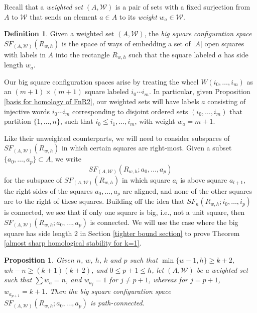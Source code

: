 \documentclass[pagebackref,colorlinks,citecolor=blue,linkcolor=blue,urlcolor=blue,filecolor=blue]{article}
\newtheorem{prop}[thm]{Proposition}
\theoremstyle{definition}\newtheorem{definition}[thm]{Definition}
\theoremstyle{definition}
\newtheorem{defn}[thm]{Definition}
\begin{document}
Recall that a \emph{weighted set} $(A, \mathcal{W})$ is a pair of sets with a fixed surjection from $A$ to $\mathcal{W}$ that sends an element $a\in A$ to its \emph{weight} $w_{a}\in \mathcal{W}$.

\begin{defn}
Given a weighted set $(A, \mathcal{W})$, the \emph{big square configuration space} $SF_{(A, \mathcal{W})}(R_{w,h})$ is the space of ways of embedding a set of $|A|$ open squares with labels in $A$ into the rectangle $R_{w,h}$ such that the square labeled $a$ has side length $w_{a}$.
\end{defn}

Our big square configuration spaces arise by treating the wheel $W(i_{0}, \dots, i_{m})$ as an $(m+1)\times (m+1)$ square labeled $i_{0}\cdots i_{m}$.
In particular, given Proposition \ref{basis for homology of FnR2}, our weighted sets will have labels $a$ consisting of injective words $i_{0}\cdots i_{m}$ corresponding to disjoint ordered sets $(i_{0}, \dots, i_{m})$ that partition $\{1, \dots, n\}$, such that $i_{0}\le i_{1},\dots, i_{m}$, with weight $w_{a}=m+1$.

Like their unweighted counterparts, we will need to consider subspaces of $SF_{(A,\mathcal{W})}(R_{w, h})$ in which certain squares are right-most.
Given a subset $\{a_{0}, \dots, a_{p}\}\subset A$, we write
\[
SF_{(A,\mathcal{W})}(R_{w, h}; a_{0}, \dots, a_{p})
\]
for the subspace of $SF_{(A,\mathcal{W})}(R_{w, h})$ in which square $a_{l}$ is above square $a_{l+1}$, the right sides of the squares $a_{0}, \dots, a_{p}$ are aligned, and none of the other squares are to the right of these squares.
Building off the idea that $SF_{n}(R_{w,h}; i_{0}, \dots, i_{p})$ is connected, we see that if only one square is big, i.e., not a unit square, then $SF_{(A,\mathcal{W})}(R_{w, h}; a_{0}, \dots, a_{p})$ is connected.
We will use the case where the big square has side length $2$ in Section \ref{tighter bound section} to prove Theorem \ref{almost sharp homological stability for k=1}.

\begin{prop}\label{free aj in k=1}
Given $n$, $w$, $h$, $k$ and $p$ such that $\min\{w-1,h\}\ge k+2$, $wh-n\ge (k+1)(k+2)$, and $0\le p+1\le h$, let $(A, \mathcal{W})$ be a weighted set such that $\sum w_{a}=n$, and $w_{a_{j}}=1$ for $j\neq p+1$, whereas for $j=p+1$, $w_{a_{p+1}}=k+1$.
Then the big square configuration space $SF_{(A,\mathcal{W})}(R_{w, h}; a_{0}, \dots, a_{p})$ is path-connected.
\end{prop}
\end{document}
